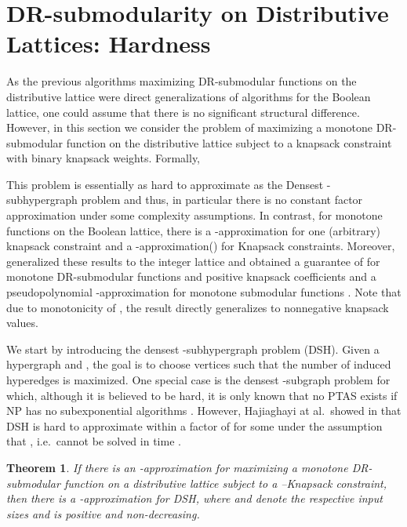 \documentclass{article}
\theoremstyle{plain}
\newtheorem{theorem}{Theorem}
\theoremstyle{definition}
\begin{document}
\section{DR-submodularity on Distributive Lattices: Hardness}\label{sec:SM-DR-DL-hardness}
As the previous algorithms maximizing DR-submodular functions on the distributive lattice were direct generalizations of algorithms for the Boolean lattice, 
one could assume that there is no significant structural difference. However, in this section we
consider the problem of maximizing a monotone DR-submodular function  on the distributive 
lattice subject to a knapsack constraint with binary knapsack weights. Formally, 


This problem is essentially as hard to approximate as the Densest -subhypergraph problem and thus, in particular there is no constant factor approximation
under some complexity assumptions. 
In contrast, for monotone functions on the Boolean lattice, there is a -approximation for one (arbitrary) knapsack constraint \cite{SviridenkoKnapsack} 
and a  -approximation(\cite{KulikMonotoneKnapsack}) for  Knapsack constraints. 
Moreover, \cite{SomaYoshi16} generalized these results to the integer lattice and obtained a guarantee of  for monotone 
DR-submodular functions and positive knapsack coefficients and a 
pseudopolynomial -approximation for monotone submodular functions 
\cite{Inaba:KnapsackIL}. Note that due to  monotonicity of , the result directly generalizes to nonnegative knapsack values. 


We start by introducing the densest -subhypergraph problem (DSH). Given a hypergraph  and , 
the goal is to choose  vertices such that the number of induced hyperedges is maximized. 
One special case is the densest -subgraph problem for which, although it is believed to be hard, 
it is only known that no PTAS exists if NP has no subexponential algorithms \cite{Khot04DkS}. 
However, Hajiaghayi at al.\ showed in \cite{HajiSubhypergraph} that DSH is hard to approximate within a factor of  
for some  under the assumption that 
, i.e.\  cannot be solved in time . 

\begin{theorem}
 \label{thm:SubmaxKnapsackHardness}
 If there is an -approximation for maximizing a monotone DR-submodular function on a distributive lattice subject to a --Knapsack constraint, 
 then there is a -approximation for DSH, where  and  denote the respective input sizes and 
  is positive and non-decreasing. 
\end{theorem}
\end{document}
